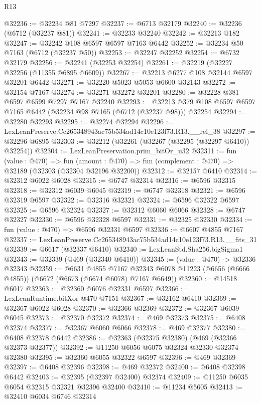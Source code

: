 \begin{lexlean}{R13}
\begin{coremodule}
@32236 := @32234 @81 @7297
@32237 := @6713 @32179
@32240 := @32236 (@6712 (@32237 @81))
@32241 := @32233 @32240
@32242 := @32213 @182
@32247 := @32242 @108 @6597 @6597 @7163 @6442
@32252 := @32234 @50 @7163 (@6712 (@32237 @50))
@32253 := @32247 @32252
@32254 := @6732 @32179
@32256 := @32241 (@32253 @32254)
@32261 := @32219 (@32227 @32256 (@11355 @6895 @6609))
@32267 := @32213 @6277 @108 @32144 @6597 @32201 @6442
@32271 := @32220 @5023 @5053 @6600 @32143
@32272 := @32154 @7167
@32274 := @32271 @32272 @32201
@32280 := @32228 @381 @6597 @6599 @7297 @7167 @32240
@32293 := @32213 @379 @108 @6597 @6597 @7165 @6442 (@32234 @98 @7165 (@6712 (@32237 @98))) @32254
@32294 := @32280 @32293
@32295 := @32274 @32294
@32296 := LexLeanPreserve.Cc265348943ac75b534ad14c10e123f73.R13.__rel_38
@32297 := @32296 @6895
@32303 := @32212 (@32261 (@32267 (@32295 (@32297 @6410)) @32254))
@32304 := LexLeanPreservation.prim_bitOr_u32
@32311 := fun (value : @470) =>
  fun (amount : @470) => fun (complement : @470) => @32189 (@32303 (@32304 @32196 @32200))
@32312 := @32157 @6410
@32314 := @32312 @6022 @6028
@32315 := @6747 @32314
@32316 := @6596 @32315
@32318 := @32312 @6039 @6045
@32319 := @6747 @32318
@32321 := @6596 @32319 @6597
@32322 := @32316 @32321
@32324 := @6596 @32322 @6597
@32325 := @6596 @32324
@32327 := @32312 @6060 @6066
@32328 := @6747 @32327
@32330 := @6596 @32328 @6597
@32331 := @32325 @32330
@32334 := fun (value : @470) => @6596 @32331 @6597
@32336 := @6607 @4855 @7167
@32337 := LexLeanPreserve.Cc265348943ac75b534ad14c10e123f73.R13.__fits_31
@32339 := @6617 (@32337 @6410)
@32340 := LexLeanStd.Sha256.bigSigma1
@32343 := @32339 (@469 (@32340 @6410))
@32345 := (value : @470) -> @32336 @32343
@32359 := @6631
    @4855
    @7167
    @32343
    @6078
    @11223
    (@6656 (@6666 @4855))
    (@6672 (@6673 (@6674 @6078) @7167 @6649))
@32360 := @14518 @6017
@32363 := @32360 @6076 @32331 @6597
@32366 := LexLeanRuntime.bitXor @470 @7151
@32367 := @32162 @6410
@32369 := @32367 @6022 @6028
@32370 := @32366 @32369
@32372 := @32367 @6039 @6045
@32373 := @32370 @32372
@32374 := @469 @32373
@32375 := @6408 @32374
@32377 := @32367 @6060 @6066
@32378 := @469 @32377
@32380 := @6408 @32378 @6442
@32386 := @32363 (@32375 @32380) (@469 (@32366 @32373 @32377))
@32392 := @11250 @6056 @6075 @32324 @32330 @32374 @32380
@32395 := @32360 @6055 @32322 @6597
@32396 := @469 @32369
@32397 := @6408 @32396
@32398 := @469 @32372
@32400 := @6408 @32398 @6442
@32403 := @32395 (@32397 @32400) @32374
@32409 := @11250 @6035 @6054 @32315 @32321 @32396 @32400
@32410 := @11234 @5605
@32413 := @32410 @6034 @6746 @32314

\end{coremodule}
\end{lexlean}
